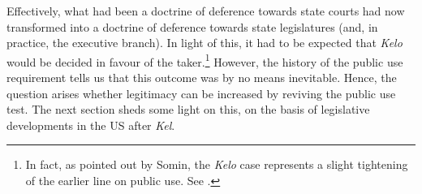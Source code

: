 Effectively, what had been a doctrine of deference towards state courts had now transformed into a doctrine of deference towards state legislatures (and, in practice, the executive branch).
 In light of this, it had to be expected that {\it Kelo} would be decided in favour of the taker.\footnote{In fact, as pointed out by Somin, the {\it Kelo} case represents a slight tightening of the earlier line on public use. See \cite{somin07}.} However, the history of the public use requirement tells us that this outcome was by no means inevitable. Hence, the question arises whether legitimacy can be increased by reviving the public use test. The next section sheds some light on this, on the basis of legislative developments in the US after {\it Kel}.

